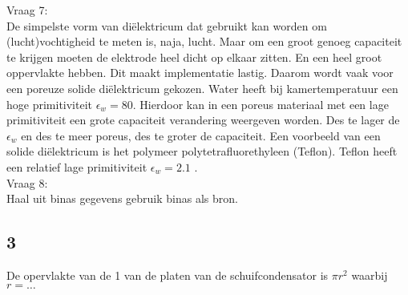     \noindent
    Vraag 7:\\
    De simpelste vorm van diëlektricum dat gebruikt kan worden om (lucht)vochtigheid te meten is, naja, lucht. Maar om een groot genoeg capaciteit te krijgen moeten de elektrode heel dicht op elkaar zitten. En een heel groot oppervlakte hebben. Dit maakt implementatie lastig. Daarom wordt vaak voor een poreuze solide diëlektricum gekozen. Water heeft bij kamertemperatuur een hoge primitiviteit $\epsilon_w=80$. Hierdoor kan in een poreus materiaal met een lage primitiviteit een grote capaciteit verandering weergeven worden. Des te lager de $\epsilon_w$ en des te meer poreus, des te groter de capaciteit. Een voorbeeld van een solide diëlektricum is het polymeer polytetrafluorethyleen (Teflon). Teflon heeft een relatief lage primitiviteit $\epsilon_w=2.1$ .\\

    \noindent
    Vraag 8:\\
    Haal uit binas gegevens gebruik binas als bron.

\subsection{3}
De opervlakte van de 1 van de platen van de schuifcondensator is 
$\pi r^2$ waarbij $r=\dots$